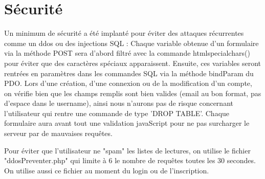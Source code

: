 \section{Sécurité}
    Un minimum de sécurité a été implanté pour éviter des attaques récurrentes comme un ddos ou des injections SQL :\newline
Chaque variable obtenue d'un formulaire via la méthode POST sera d'abord filtré avec la commande htmlspecialchars() pour éviter que des caractères spéciaux apparaissent. Ensuite, ces variables seront rentrées en paramètres dans les commandes SQL via la méthode bindParam du PDO.\newline
Lors d'une création, d'une connexion ou de la modification d'un compte, on vérifie bien que les champs remplis sont bien valides (email au bon format, pas d'espace dans le username), ainsi nous n'aurons pas de risque concernant l'utilisateur qui rentre une commande de type 'DROP TABLE'.\newline
Chaque formulaire aura avant tout une validation javaScript pour ne pas surcharger le serveur par de mauvaises requêtes.\newline\newline

Pour éviter que l'utilisateur ne "spam" les listes de lectures, on utilise le fichier "ddosPreventer.php" qui limite à 6 le nombre de requêtes toutes les 30 secondes. On utilise aussi ce fichier au moment du login ou de l'inscription. 


